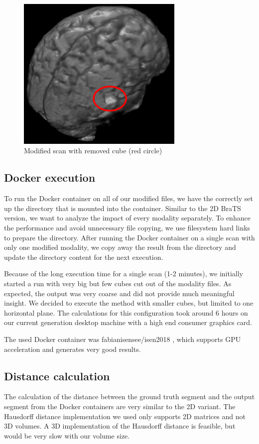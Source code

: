 \begin{figure}[H]
\centering
\includegraphics[width=8cm]{chapters/07_brats3d/images/brain-hdm-marked.png}
\caption{Modified scan with removed cube (red circle)}
\label{brats3d_example}
\end{figure}

\subsection{Docker execution}
To run the Docker container on all of our modified files, we have the correctly set up the directory that is mounted into the container. Similar to the 2D BraTS version, we want to analyze the impact of every modality separately. To enhance the performance and avoid unnecessary file copying, we use filesystem hard links to prepare the directory. After running the Docker container on a single scan with only one modified modality, we copy away the result from the directory and update the directory content for the next execution.

Because of the long execution time for a single scan (1-2 minutes), we initially started a run with very big but few cubes cut out of the modality files. As expected, the output was very coarse and did not provide much meaningful insight. We decided to execute the method with smaller cubes, but limited to one horizontal plane. The calculations for this configuration took around 6 hours on our current generation desktop machine with a high end consumer graphics card.

The used Docker container was fabianisensee/isen2018 \cite{brats3ddocker}, which supports GPU acceleration and generates very good results.

\subsection{Distance calculation}
The calculation of the distance between the ground truth segment and the output segment from the Docker containers are very similar to the 2D variant. The Hausdorff distance implementation we used only supports 2D matrices and not 3D volumes. A 3D implementation of the Hausdorff distance is feasible, but would be very slow with our volume size. 

